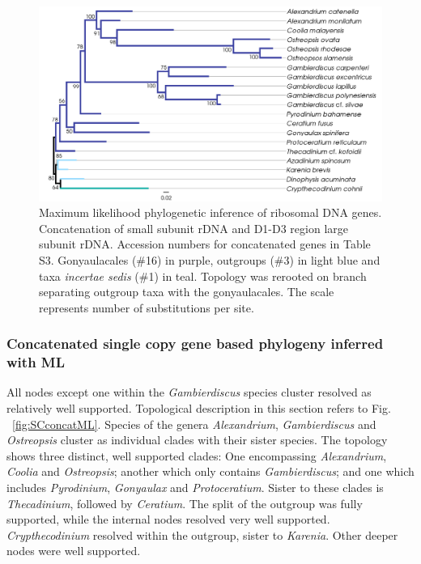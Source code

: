 \documentclass[12pt]{article}
\begin{document}
\begin{figure} 
\includegraphics[scale=.4]{figures/rDNA-ML.png} 
\caption{Maximum likelihood phylogenetic inference of ribosomal DNA genes. Concatenation of small subunit rDNA and D1-D3 region large subunit rDNA. Accession numbers for concatenated genes in Table S3. Gonyaulacales (\#16) in purple, outgroups (\#3) in light blue and taxa \textit{incertae sedis} (\#1) in teal. Topology was rerooted on branch separating outgroup taxa with the gonyaulacales. The scale represents number of substitutions per site.} 
\label{fig:rdna}
\end{figure} 
\FloatBarrier

\subsubsection*{Concatenated single copy gene based phylogeny inferred with ML}
\FloatBarrier
All nodes except one within the \emph{Gambierdiscus} species cluster resolved as relatively well supported. 
Topological description in this section refers to Fig. ~\ref{fig:SCconcatML}. 
Species of the genera \emph{Alexandrium}, \emph{Gambierdiscus} and \emph{Ostreopsis} cluster as individual clades with their sister species.  
The topology shows three distinct, well supported clades: 
One encompassing \emph{Alexandrium}, \emph{Coolia} and \emph{Ostreopsis}; another which only contains \emph{Gambierdiscus}; and one which includes \emph{Pyrodinium}, \emph{Gonyaulax} and \emph{Protoceratium}. 
Sister to these clades is \emph{Thecadinium}, followed by \emph{Ceratium}.
The split of the outgroup was fully supported, while the internal nodes resolved very well supported. 
\emph{Crypthecodinium} resolved within the outgroup, sister to \emph{Karenia}. 
Other deeper nodes were well supported.
 
\end{document}
